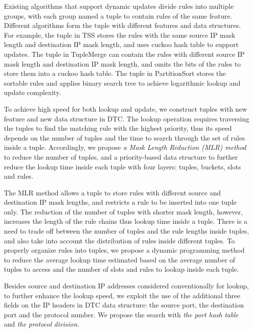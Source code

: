 Existing algorithms that support dynamic updates divide rules into multiple groups, with each group named a tuple to contain rules of the same feature. Different algorithms form the tuple with different features and data structures. For example, the tuple in TSS stores the rules with the same source IP mask length and destination IP mask length, and uses cuckoo hash table to support updates. The tuple in TupleMerge can contain the rules with different source IP mask length and destination IP mask length, and omits the bits of the rules to store them into a cuckoo hash table. The tuple in PartitionSort stores the sortable rules and applies binary search tree to achieve logarithmic lookup and update complexity.

To achieve high speed for both lookup and update, we construct tuples with new feature and new data structure in DTC. The lookup operation requires traversing the tuples to find the matching rule with the highest priority, thus its speed depends on the number of tuples
and the time to search through the set of rules inside a tuple. Accordingly,  we propose \textit{a Mask Length Reduction (MLR) method} to reduce the number of tuples, and a priority-based data structure to further reduce the lookup time inside each tuple with four layers: tuples, buckets, slots and rules.

The MLR method allows a tuple to store rules with different source and destination IP mask lengths, and restricts a rule to be inserted into one tuple only. The reduction of the number of tuples with shorter mask length, however, increases the length of the rule chains thus lookup time inside a tuple. There is a need to trade off between the number of tuples and the rule lengths inside tuples, and also take into account the distribution of rules inside different tuples. To properly organize rules into tuples, we propose a dynamic programming method to reduce the average lookup time estimated based on the average number of tuples to access and the number of slots and rules to lookup inside each tuple.

Besides source and destination IP addresses considered conventionally  for lookup, to further enhance the lookup speed, we exploit the use of the additional three fields on the IP headers in DTC data structure: the source port, the destination port and the protocol number. We propose the search with \textit{the port hash table} and \textit{the protocol division}.

